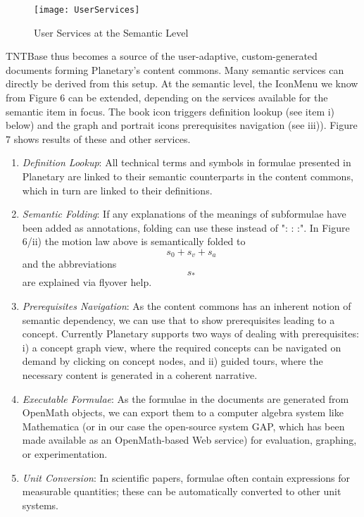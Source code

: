 \begin{figure}[ht]\centering
  \texttt{[image: UserServices]}
  \caption{User Services at the Semantic Level}\label{fig:adt:semantic} 
\end{figure} 

TNTBase thus becomes a source of the user-adaptive, custom-generated documents forming
Planetary's content commons. Many semantic services can directly be derived from this setup. At the semantic level, the IconMenu we know from Figure 6 can be extended,
depending on the services available for the semantic item in focus. The book icon triggers
definition lookup (see item i) below) and the graph and portrait icons prerequisites
navigation (see iii)). Figure 7 shows results of these and other services.

\begin{enumerate}
\item \textit{Definition Lookup}: All technical terms and symbols in formulae presented in
  Planetary are linked to their semantic counterparts in the content commons, which in
  turn are linked to their definitions.
\item \textit{Semantic Folding}: If any explanations of the meanings of subformulae have
  been added as annotations, folding can use these instead of ": : :". In Figure 6/ii) the
  motion law above is semantically folded to \[s_0 + s_v + s_a \]
  and the abbreviations \[s_*\] are explained via flyover help.
\item \textit{Prerequisites Navigation}: As the content commons has an inherent notion of
  semantic dependency, we can use that to show prerequisites leading to a
  concept. Currently Planetary supports two ways of dealing with prerequisites: i) a
  concept graph view, where the required concepts can be navigated on demand by clicking
  on concept nodes, and ii) guided tours, where the necessary content is generated in a
  coherent narrative.
\item \textit{Executable Formulae}: As the formulae in the documents are generated from
  OpenMath objects, we can export them to a computer algebra system like Mathematica (or
  in our case the open-source system GAP, which has been made available as an
  OpenMath-based Web service) for evaluation, graphing, or experimentation.
\item \textit{Unit Conversion}: In scientific papers, formulae often contain expressions
  for measurable quantities; these can be automatically converted to other unit systems.
\end{enumerate}

